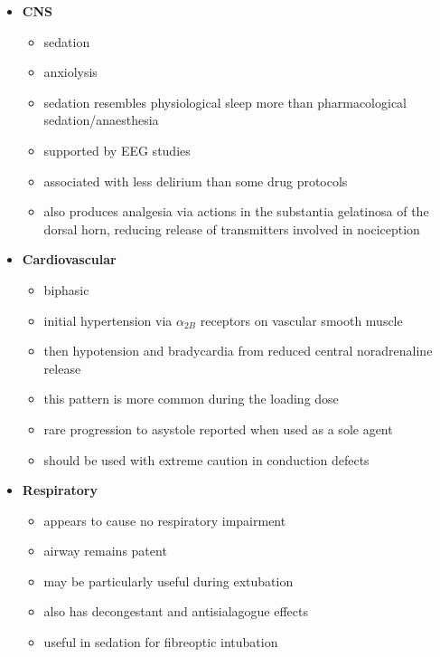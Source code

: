 \documentclass[11pt,a4paper]{article}
\begin{document}
\begin{itemize}
  \item \textbf{CNS}
  \begin{itemize}
    \item sedation
    \item anxiolysis
    \item sedation resembles physiological sleep more than pharmacological sedation/anaesthesia
    \item supported by EEG studies
    \item associated with less delirium than some drug protocols
    \item also produces analgesia via actions in the substantia gelatinosa of the dorsal horn, reducing release of transmitters involved in nociception
  \end{itemize}
  \item \textbf{Cardiovascular}
  \begin{itemize}
    \item biphasic
    \item initial hypertension via $\alpha_{2B}$ receptors on vascular smooth muscle
    \item then hypotension and bradycardia from reduced central noradrenaline release
    \item this pattern is more common during the loading dose
    \item rare progression to asystole reported when used as a sole agent
    \item should be used with extreme caution in conduction defects
  \end{itemize}
  \item \textbf{Respiratory}
  \begin{itemize}
    \item appears to cause no respiratory impairment
    \item airway remains patent
    \item may be particularly useful during extubation
    \item also has decongestant and antisialagogue effects
    \item useful in sedation for fibreoptic intubation
  \end{itemize}
\end{itemize}
\end{document}

